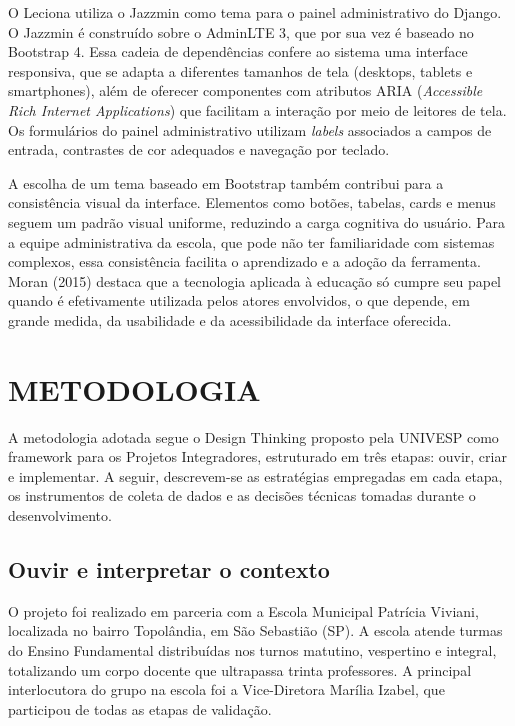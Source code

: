 O Leciona utiliza o Jazzmin como tema para o painel administrativo do Django. O Jazzmin é construído sobre o AdminLTE 3, que por sua vez é baseado no Bootstrap 4. Essa cadeia de dependências confere ao sistema uma interface responsiva, que se adapta a diferentes tamanhos de tela (desktops, tablets e smartphones), além de oferecer componentes com atributos ARIA (\textit{Accessible Rich Internet Applications}) que facilitam a interação por meio de leitores de tela. Os formulários do painel administrativo utilizam \textit{labels} associados a campos de entrada, contrastes de cor adequados e navegação por teclado.

A escolha de um tema baseado em Bootstrap também contribui para a consistência visual da interface. Elementos como botões, tabelas, cards e menus seguem um padrão visual uniforme, reduzindo a carga cognitiva do usuário. Para a equipe administrativa da escola, que pode não ter familiaridade com sistemas complexos, essa consistência facilita o aprendizado e a adoção da ferramenta. Moran (2015) destaca que a tecnologia aplicada à educação só cumpre seu papel quando é efetivamente utilizada pelos atores envolvidos, o que depende, em grande medida, da usabilidade e da acessibilidade da interface oferecida.


\section[Metodologia]{METODOLOGIA}

A metodologia adotada segue o Design Thinking proposto pela UNIVESP como framework para os Projetos Integradores, estruturado em três etapas: ouvir, criar e implementar. A seguir, descrevem-se as estratégias empregadas em cada etapa, os instrumentos de coleta de dados e as decisões técnicas tomadas durante o desenvolvimento.

\subsection{Ouvir e interpretar o contexto}

O projeto foi realizado em parceria com a Escola Municipal Patrícia Viviani, localizada no bairro Topolândia, em São Sebastião (SP). A escola atende turmas do Ensino Fundamental distribuídas nos turnos matutino, vespertino e integral, totalizando um corpo docente que ultrapassa trinta professores. A principal interlocutora do grupo na escola foi a Vice-Diretora Marília Izabel, que participou de todas as etapas de validação.

